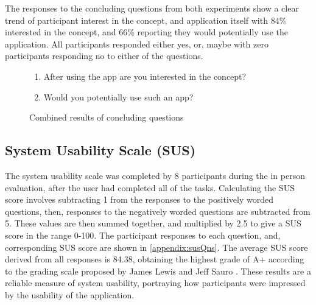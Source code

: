 The responses to the concluding questions from both experiments show a clear trend of participant interest in the concept, and application itself with 84\% interested in the concept, and 66\% reporting they would potentially use the application. All participants responded either yes, or, maybe with zero participants responding no to either of the questions.

\begin{figure}[H]

\begin{enumerate}
    \item After using the app are you interested in the concept?
    \item Would you potentially use such an app?
\end{enumerate}
\caption{Combined results of concluding questions}
\label{fig:conclAns}
\end{figure}
\FloatBarrier

\subsection{System Usability Scale (SUS)}
The system usability scale was completed by 8 participants during the in person evaluation, after the user had completed all of the tasks. Calculating the SUS score involves subtracting 1 from the responses to the positively worded questions, then, responses to the negatively worded questions are subtracted from 5. These values are then summed together, and multiplied by 2.5 to give a SUS score in the range 0-100. The participant responses to each question, and, corresponding SUS score are shown in \ref{appendix:susQns}. The average SUS score derived from all responses is 84.38, obtaining the highest grade of A+ according to the grading scale proposed by James Lewis and Jeff Sauro \cite{susGrades}. These results are a reliable measure of system usability, portraying how participants were impressed by the usability of the application.

